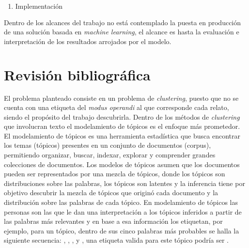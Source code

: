 \documentclass[letterpaper,12pt,oneside]{book} %
\begin{document}
\begin{enumerate}
    \item Implementación
\end{enumerate}

Dentro de los alcances del trabajo no está contemplado la puesta en producción de una solución basada en \textit{machine learning}, el alcance es hasta la evaluación e interpretación de los resultados arrojados por el modelo.

\chapter{Revisión bibliográfica}

El problema planteado consiste en un problema de \textit{clustering}, puesto que no se cuenta con una etiqueta del \textit{modus operandi} al que corresponde cada relato, siendo el propósito del trabajo descubrirla. Dentro de los métodos de \textit{clustering} que involucran texto el modelamiento de tópicos es el enfoque más prometedor.%
El modelamiento de tópicos es una herramienta estadística que busca encontrar los temas (tópicos) presentes en un conjunto de documentos (corpus), permitiendo organizar, buscar, indexar, explorar y comprender grandes colecciones de documentos. %
Los modelos de tópicos asumen que los documentos pueden ser representados por una mezcla de tópicos, donde los tópicos son distribuciones sobre las palabras, los tópicos son latentes y la inferencia tiene por objetivo descubrir la mezcla de tópicos que originó cada documento y la distribución sobre las palabras de cada tópico. En modelamiento de tópicos las personas son las que le dan una interpretación a los tópicos inferidos a partir de las palabras más relevantes y en base a esa información los etiquetan, por ejemplo, para un tópico, dentro de sus cinco palabras más probables se halla la siguiente secuencia: , , ,  y , una etiqueta valida para este tópico podría ser .\\
\end{document}
